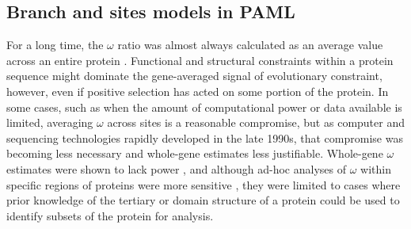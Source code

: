 \subsection{Branch and sites models in PAML}

For a long time, the $\omega$ ratio was almost always calculated as an
average value across an entire protein \citep{Sharp1997}. Functional
and structural constraints within a protein sequence might dominate
the gene-averaged signal of evolutionary constraint, however, even if
positive selection has acted on some portion of the protein. In some
cases, such as when the amount of computational power or data
available is limited, averaging $\omega$ across sites is a reasonable
compromise, but as computer and sequencing technologies rapidly
developed in the late 1990s, that compromise was becoming less
necessary and whole-gene estimates less justifiable. Whole-gene
$\omega$ estimates were shown to lack power \citep{Endo1996}, and
although ad-hoc analyses of $\omega$ within specific regions of proteins
were more sensitive \citep{Hughes1988}, they were limited to cases
where prior knowledge of the tertiary or domain structure of a protein
could be used to identify subsets of the protein for analysis.

